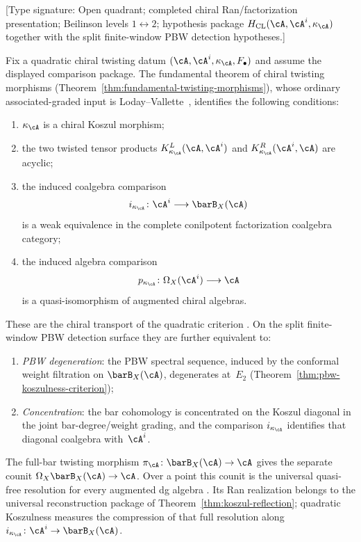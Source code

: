 \begin{remark}
\label{rem:equivalent-formulations-koszul}
\textup{[Type signature: Open quadrant; completed chiral
Ran/factorization presentation; Beilinson levels
$1\leftrightarrow2$; hypothesis package
$H_{\mathrm{CL}}(\cA,\cA^i,\kappa_\cA)$ together with the split
finite-window PBW detection hypotheses.]}

Fix a quadratic chiral twisting datum
$(\cA,\cA^i,\kappa_\cA,F_\bullet)$ and assume the displayed
comparison package. The fundamental theorem of chiral twisting
morphisms (Theorem~\ref{thm:fundamental-twisting-morphisms}), whose
ordinary associated-graded input is
Loday--Vallette~\cite[Theorem~2.3.2]{LV12}, identifies the following
conditions:
\begin{enumerate}[label=\textup{(\roman*)}]
\item $\kappa_\cA$ is a chiral Koszul morphism;
\item the two twisted tensor products
 $K_{\kappa_\cA}^L(\cA,\cA^i)$ and
 $K_{\kappa_\cA}^R(\cA^i,\cA)$ are acyclic;
\item the induced coalgebra comparison
 \[
 i_{\kappa_\cA}\colon\cA^i\longrightarrow\barB_X(\cA)
 \]
 is a weak equivalence in the complete conilpotent factorization
 coalgebra category;
\item the induced algebra comparison
 \[
 p_{\kappa_\cA}\colon\Omega_X(\cA^i)\longrightarrow\cA
 \]
 is a quasi-isomorphism of augmented chiral algebras.
\end{enumerate}
These are the chiral transport of the quadratic criterion
\cite[Theorem~3.4.6]{LV12}. On the split finite-window PBW detection
surface they are further equivalent to:
\begin{enumerate}[label=\textup{(\roman*)},resume]
\item \emph{PBW degeneration}: the PBW spectral sequence,
 induced by the conformal weight filtration on $\barB_X(\cA)$,
 degenerates at~$E_2$
 \textup{(}Theorem~\textup{\ref{thm:pbw-koszulness-criterion})};
\item \emph{Concentration}: the bar cohomology is concentrated on
 the Koszul diagonal in the joint bar-degree/weight grading, and
 the comparison $i_{\kappa_\cA}$ identifies that diagonal
 coalgebra with~$\cA^i$.
\end{enumerate}
The full-bar twisting morphism
$\pi_\cA\colon\barB_X(\cA)\to\cA$ gives the separate counit
$\Omega_X\barB_X(\cA)\to\cA$. Over a point this counit is the
universal quasi-free resolution for every augmented dg algebra
\cite[Corollary~2.3.4]{LV12}. Its Ran realization belongs to the
universal reconstruction package of
Theorem~\ref{thm:koszul-reflection}; quadratic Koszulness measures
the compression of that full resolution along
$i_{\kappa_\cA}\colon\cA^i\to\barB_X(\cA)$.
\end{remark}

